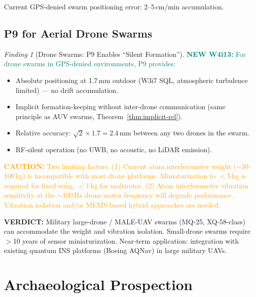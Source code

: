 \documentclass[11pt]{article}
\theoremstyle{definition}
\theoremstyle{remark}
\newtheorem{finding}[theorem]{Finding}
\newcommand{\caution}[1]{\textcolor{orange}{\textbf{CAUTION:} #1}}
\newcommand{\verdict}[1]{\textcolor{green!50!black}{\textbf{VERDICT:} #1}}
\newcommand{\newfinding}[1]{\textcolor{teal}{\textbf{NEW W4i13:} #1}}
\begin{document}
Current GPS-denied swarm positioning error: 2--5\,cm/min accumulation.

\subsection{P9 for Aerial Drone Swarms}

\begin{finding}[Drone Swarms: P9 Enables ``Silent Formation'']
\label{find:drone-swarm}
\newfinding{For drone swarms in GPS-denied environments, P9 provides:}
\begin{itemize}[nosep]
\item Absolute positioning at 1.7\,mm outdoor (W3i7 SQL, atmospheric
  turbulence limited) --- no drift accumulation.
\item Implicit formation-keeping without inter-drone communication
  (same principle as AUV swarms, Theorem~\ref{thm:implicit-rel}).
\item Relative accuracy: $\sqrt{2}\times 1.7 = 2.4$\,mm between any
  two drones in the swarm.
\item RF-silent operation (no UWB, no acoustic, no LiDAR emission).
\end{itemize}

\caution{Two limiting factors: (1) Current atom interferometer
weight ($\sim$30--100\,kg) is incompatible with most drone platforms.
Miniaturization to $<$5\,kg is required for fixed-wing, $<$1\,kg for
multirotor. (2) Atom interferometer vibration sensitivity at the
$\sim$100\,Hz drone motor frequency will degrade performance.
Vibration isolation and/or MEMS-based hybrid approaches are needed.}

\verdict{Military large-drone / MALE-UAV swarms (MQ-25, XQ-58-class)
can accommodate the weight and vibration isolation. Small-drone swarms
require $>$10 years of sensor miniaturization. Near-term application:
integration with existing quantum INS platforms (Boeing AQNav)
in large military UAVs.}
\end{finding}

\section{Archaeological Prospection}
\label{sec:archaeology}
\end{document}
